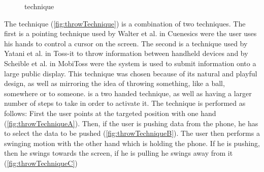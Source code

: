 \begin{figure}[H]
	\caption{\push \swipe technique}
	\label{fig:swipeTechnique}
\end{figure}

The \throw technique (\cref{fig:throwTechnique}) is a combination of two techniques.
The first is a pointing technique used by Walter et al. in Cuenesics \cite{Walter:2014} were the user uses his hands to control a cursor on the screen.
The second is a technique used by Yatani et al. \cite{Yatani:2005} in Toss-it to throw information between handheld devices and by Scheible et al. in MobiToss \cite{Scheible:2008} were the system is used to submit information onto a large public display.
This technique was chosen because of its natural and playful design, as well as mirroring the idea of throwing something, like a ball, somewhere or to someone.
\throw is a two handed technique, as well as having a larger number of steps to take in order to activate it.
The \throw technique is performed as follows: 
First the user points at the targeted position with one hand (\cref{fig:throwTechniqueA}).
Then, if the user is pushing data from the phone, he has to select the data to be pushed (\cref{fig:throwTechniqueB}).
The user then performs a swinging motion with the other hand which is holding the phone.
If he is pushing, then he swings towards the screen, if he is pulling he swings away from it (\cref{fig:throwTechniqueC}) 


